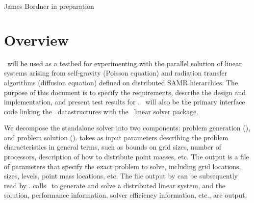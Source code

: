 \documentclass[10pt]{article}
\begin{document}
      {James Bordner}
      {in preparation}

\section{Overview}

   \hypresolve\ will be used as a testbed for experimenting with the
   parallel solution of linear systems arising from self-gravity
   (Poisson equation) and radiation transfer algorithms (diffusion
   equation) defined on distributed SAMR hierarchies.  The purpose of
   this document is to specify the requirements, describe the design
   and implementation, and present test results for \hypresolve.
   \hypresolve\ will also be the primary interface code linking the
   \enzo\ datastructures with the \hypre\ linear solver package.

   We decompose the standalone solver into two components: problem
   generation (), and problem solution
   ().   takes as input parameters
   describing the problem characteristics in general terms, such as
   bounds on grid sizes, number of processors, description of how to
   distribute point masses, etc.  The output is a file of parameters
   that specify the exact problem to solve, including grid locations,
   sizes, levels, point mass locations, etc.  The file output by
    can be subsequently read by .
    calls \hypre\ to generate and solve a
   distributed linear system, and the solution, performance
   information, solver efficiency information, etc., are output.
\end{document}
